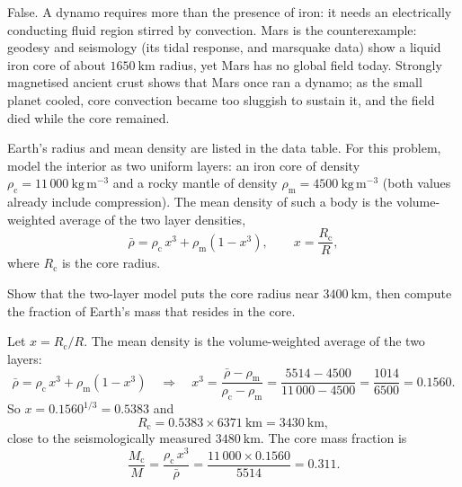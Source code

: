 \begin{solution}
False.
A dynamo requires more than the presence of iron: it needs an electrically conducting fluid region stirred by convection.
Mars is the counterexample: geodesy and seismology (its tidal response, and marsquake data) show a liquid iron core of about $1650\ \mathrm{km}$ radius, yet Mars has no global field today.
Strongly magnetised ancient crust shows that Mars once ran a dynamo; as the small planet cooled, core convection became too sluggish to sustain it, and the field died while the core remained.
\end{solution}



Earth's radius and mean density are listed in the data table.
For this problem, model the interior as two uniform layers: an iron core of density $\rho_{\mathrm{c}} = 11\,000\ \mathrm{kg\,m^{-3}}$ and a rocky mantle of density $\rho_{\mathrm{m}} = 4500\ \mathrm{kg\,m^{-3}}$ (both values already include compression).
The mean density of such a body is the volume-weighted average of the two layer densities,
\[
  \bar{\rho} = \rho_{\mathrm{c}}\, x^3 + \rho_{\mathrm{m}} \left( 1 - x^3 \right), \qquad x = \frac{R_{\mathrm{c}}}{R},
\]
where $R_{\mathrm{c}}$ is the core radius.

\parti {} Show that the two-layer model puts the core radius near $3400\ \mathrm{km}$, then compute the fraction of Earth's mass that resides in the core.

\begin{solution}
Let $x = R_{\mathrm{c}}/R$.
The mean density is the volume-weighted average of the two layers:
\[
  \bar{\rho} = \rho_{\mathrm{c}}\, x^3 + \rho_{\mathrm{m}} (1 - x^3)
  \quad \Longrightarrow \quad
  x^3 = \frac{\bar{\rho} - \rho_{\mathrm{m}}}{\rho_{\mathrm{c}} - \rho_{\mathrm{m}}} = \frac{5514 - 4500}{11\,000 - 4500} = \frac{1014}{6500} = 0.1560.
\]
So $x = 0.1560^{1/3} = 0.5383$ and
\[
  R_{\mathrm{c}} = 0.5383 \times 6371\ \mathrm{km} = 3430\ \mathrm{km},
\]
close to the seismologically measured $3480\ \mathrm{km}$.
The core mass fraction is
\[
  \frac{M_{\mathrm{c}}}{M} = \frac{\rho_{\mathrm{c}}\, x^3}{\bar{\rho}} = \frac{11\,000 \times 0.1560}{5514} = 0.311.
\]
\end{solution}

